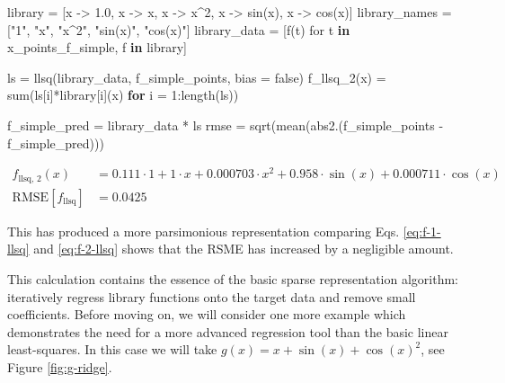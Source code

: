 \documentclass[
]{article}
\newenvironment{Shaded}{\begin{snugshade}}{\end{snugshade}}
\newcommand{\ConstantTok}[1]{\textcolor[rgb]{0.56,0.35,0.01}{#1}}
\newcommand{\ControlFlowTok}[1]{\textcolor[rgb]{0.00,0.23,0.31}{\textbf{#1}}}
\newcommand{\FloatTok}[1]{\textcolor[rgb]{0.68,0.00,0.00}{#1}}
\newcommand{\FunctionTok}[1]{\textcolor[rgb]{0.28,0.35,0.67}{#1}}
\newcommand{\KeywordTok}[1]{\textcolor[rgb]{0.00,0.23,0.31}{\textbf{#1}}}
\newcommand{\NormalTok}[1]{\textcolor[rgb]{0.00,0.23,0.31}{#1}}
\newcommand{\OperatorTok}[1]{\textcolor[rgb]{0.37,0.37,0.37}{#1}}
\newcommand{\StringTok}[1]{\textcolor[rgb]{0.13,0.47,0.30}{#1}}
\begin{document}
\begin{Shaded}
\begin{Highlighting}[]
\NormalTok{library }\OperatorTok{=}\NormalTok{ [x }\OperatorTok{{-}\textgreater{}} \FloatTok{1.0}\NormalTok{, x }\OperatorTok{{-}\textgreater{}}\NormalTok{ x, x }\OperatorTok{{-}\textgreater{}}\NormalTok{ x}\OperatorTok{\^{}}\FloatTok{2}\NormalTok{, x }\OperatorTok{{-}\textgreater{}} \FunctionTok{sin}\NormalTok{(x), x }\OperatorTok{{-}\textgreater{}} \FunctionTok{cos}\NormalTok{(x)]}
\NormalTok{library\_names }\OperatorTok{=}\NormalTok{ [}\StringTok{"1"}\NormalTok{, }\StringTok{"x"}\NormalTok{, }\StringTok{"x\^{}2"}\NormalTok{, }\StringTok{"sin(x)"}\NormalTok{, }\StringTok{"cos(x)"}\NormalTok{]}
\NormalTok{library\_data }\OperatorTok{=}\NormalTok{ [}\FunctionTok{f}\NormalTok{(t) for t }\KeywordTok{in}\NormalTok{ x\_points\_f\_simple, f }\KeywordTok{in}\NormalTok{ library]}

\NormalTok{ls }\OperatorTok{=} \FunctionTok{llsq}\NormalTok{(library\_data, f\_simple\_points, bias }\OperatorTok{=} \ConstantTok{false}\NormalTok{)}
\FunctionTok{f\_llsq\_2}\NormalTok{(x) }\OperatorTok{=} \FunctionTok{sum}\NormalTok{(ls[i]}\OperatorTok{*}\NormalTok{library[i](x) }\ControlFlowTok{for}\NormalTok{ i }\OperatorTok{=} \FloatTok{1}\OperatorTok{:}\FunctionTok{length}\NormalTok{(ls))}

\NormalTok{f\_simple\_pred }\OperatorTok{=}\NormalTok{ library\_data }\OperatorTok{*}\NormalTok{ ls}
\NormalTok{rmse }\OperatorTok{=} \FunctionTok{sqrt}\NormalTok{(}\FunctionTok{mean}\NormalTok{(}\FunctionTok{abs2}\NormalTok{.(f\_simple\_points }\OperatorTok{{-}}\NormalTok{ f\_simple\_pred)))}
\end{Highlighting}
\end{Shaded}

\begin{subequations} \label{eq:f-2-llsq} \begin{align}    f_{\text{llsq, 2}}(x) &= 0.111 \cdot 1 + 1 \cdot x + 0.000703 \cdot x^{2} + 0.958 \cdot \sin\left( x \right) + 0.000711 \cdot \cos\left( x \right) \\
    \text{RMSE}[f_{\text{llsq}}] &= 0.0425 \end{align} \end{subequations}

This has produced a more parsimonious representation comparing Eqs.
\eqref{eq:f-1-llsq} and \eqref{eq:f-2-llsq} shows that the RSME has
increased by a negligible amount.

This calculation contains the essence of the basic sparse representation
algorithm: iteratively regress library functions onto the target data
and remove small coefficients. Before moving on, we will consider one
more example which demonstrates the need for a more advanced regression
tool than the basic linear least-squares. In this case we will take
\(g(x) = x + \sin(x) + \cos(x)^2\), see Figure \ref{fig:g-ridge}.
\end{document}
